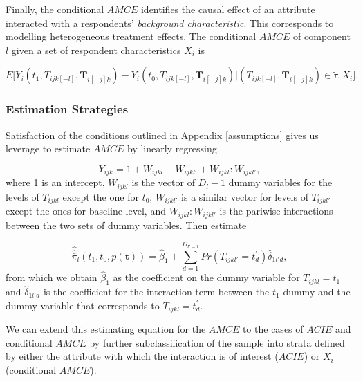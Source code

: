 \documentclass[11pt]{article}
\begin{document}
Finally, the conditional $AMCE$ identifies the causal effect of an attribute interacted with a respondents' \textit{background characteristic}. This corresponds to modelling heterogeneous treatment effects. The conditional $AMCE$ of component $l$ given a set of respondent characteristics $X_i$ is

\begin{equation}
E\bigg[Y_i(t_1, T_{ijk[-l]}, \bm{T}_{i[-j]k}) - Y_i(t_0, T_{ijk[-l]}, \bm{T}_{i[-j]k}) | (T_{ijk[-l]}, \bm{T}_{i[-j]k}) \in \tilde{\tau}, X_i\bigg].
\end{equation}

\subsubsection{Estimation Strategies}
Satisfaction of the conditions outlined in Appendix \ref{assumptions} gives us leverage to estimate $AMCE$ by linearly regressing

\begin{equation}
Y_{ijk} = 1 + W_{ijkl} + W_{ijkl'} + W_{ijkl}:W_{ijkl'},
\end{equation}
where 1 is an intercept, $W_{ijkl}$ is the vector of $D_l - 1$ dummy variables for the levels of $T_{ijkl}$ except the one for $t_0$,  $W_{ijkl'}$ is a similar vector for levels of $T_{ijkl'}$ except the ones for baseline level, and $W_{ijkl}:W_{ijkl'}$ is the pariwise interactions between the two sets of dummy variables. Then estimate

\begin{equation}
\hat{\hat{\bar{\pi}}}_l(t_1, t_0, p(\bm{t})) = \hat{\beta}_1 + \sum_{d=1}^{D_{l'-1}}Pr(T_{ijkl'} = t_d^{'})\hat{\delta}_{1l'd},
\end{equation}
from which we obtain $\hat{\beta}_1$ as the coefficient on the dummy variable for $T_{ijkl} = t_1$ and $\hat{\delta}_{1l'd}$ is the coefficient for the interaction term between the $t_1$ dummy and the dummy variable that corresponds to $T_{ijkl} = t_d^{'}$.

We can extend this estimating equation for the $AMCE$ to the cases of $ACIE$ and conditional $AMCE$ by further subclassification of the sample into strata defined by either the attribute with which the interaction is of interest ($ACIE$) or $X_i$ (conditional $AMCE$).
\end{document}
